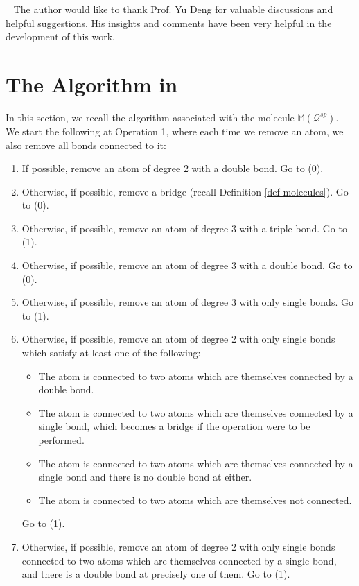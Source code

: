 \documentclass[UTF-8,reqno]{amsart}
\numberwithin{equation}{section}
\def\theequation{\arabic{section}.\arabic{equation}}
\theoremstyle{definition}
\begin{document}
\ 
The author would like to thank Prof. Yu Deng for valuable discussions and
helpful suggestions. His insights and comments have been very helpful in
the development of this work.

\appendix
 \renewcommand{\appendixname}{Appendix~\Alph{section}}
  \renewcommand{\theequation}{A.\arabic{equation}}

\section{The Algorithm in \cite{Vas24}}\label{sec:app}
In this section, we recall the algorithm associated with the molecule $\mathbb{M}(\mathcal{Q}^{sp})$.  We start   the following at Operation 1, where each time we remove an atom, we also remove all  bonds connected to it:
 \begin{enumerate}
     \item[(0)] If possible, remove an atom of degree 2 with a double bond. Go to (0).
     \item  Otherwise, if possible, remove a bridge (recall Definition \ref{def-molecules}). Go to (0).
     \item  Otherwise, if possible, remove an atom of degree 3 with a triple bond. Go to (1).
     \item Otherwise, if possible, remove an atom of degree 3 with a double bond. Go to (0).
     \item  Otherwise, if possible, remove an atom of degree 3 with only single bonds. Go to (1).
     \item Otherwise, if possible, remove an atom of degree 2 with only single bonds which  satisfy at least one of the following:
\begin{itemize}
    \item  The atom is connected to two atoms which are themselves connected by a double  bond.
    \item  The atom is connected to two atoms which are themselves connected by a single  bond, which becomes a bridge if the operation were to be performed.
    \item  The atom is connected to two atoms which are themselves connected by a single  bond and there is no double bond at either. 
    \item  The atom is connected to two atoms which are themselves not connected.
\end{itemize}
 Go to (1).
 \item  Otherwise, if possible, remove an atom of degree 2 with only single bonds connected  to two atoms which are themselves connected by a single bond, and there is a double  bond at precisely one of them. Go to (1).

\end{enumerate}
\end{document}
